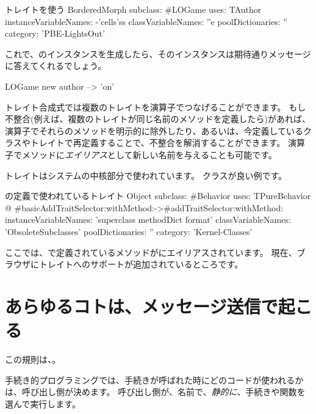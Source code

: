 \documentclass[a4paper,10pt,twoside]{book}
\begin{document}
\begin{classdef}[sbegamewithtrait]{トレイトを使う}
BorderedMorph subclass: #LOGame
	uses: TAuthor
	instanceVariableNames: -'cells'ss
	classVariableNames: ''e
	poolDictionaries: ''
	category: 'PBE-LightsOut'
\end{classdef}

これで、のインスタンスを生成したら、そのインスタンスは期待通りメッセージに答えてくれるでしょう。

\begin{code}{}
LOGame new author --> 'on'
\end{code}

トレイト合成式では複数のトレイトを\ct{+}演算子でつなげることができます。
もし不整合(例えば、複数のトレイトが同じ名前のメソッドを定義したら)があれば、\ct{-}演算子でそれらのメソッドを明示的に除外したり、あるいは、今定義しているクラスやトレイトで再定義することで、不整合を解消することができます。
演算子でメソッドに\emph{エイリアス}として新しい名前を与えることも可能です。

トレイトはシステムの中核部分で使われています。
\mbox{}クラスが良い例です。

\begin{classdef}[behaviorwithtraits]{の定義で使われているトレイト}
Object subclass: #Behavior
	uses: TPureBehavior @ {#basicAddTraitSelector:withMethod:->#addTraitSelector:withMethod:}
	instanceVariableNames: 'superclass methodDict format'
	classVariableNames: 'ObsoleteSubclasses'
	poolDictionaries: ''
	category: 'Kernel-Classes'
\end{classdef}
\noindent
ここでは、で定義されているメソッドがにエイリアスされています。
現在、ブラウザにトレイトへのサポートが追加されているところです。

\section{あらゆるコトは、メッセージ送信で起こる}


この規則は、。

手続き的プログラミングでは、手続きが呼ばれた時にどのコードが使われるかは、呼び出し側が決めます。
呼び出し側が、名前で、\emph{静的に}、手続きや関数を選んで実行します。
\end{document}
